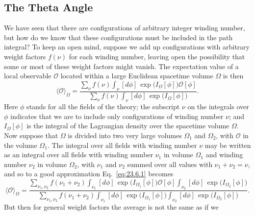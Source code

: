 \subsection{The Theta Angle}
\label{sec:23.6}

We have seen that there are configurations of arbitrary integer winding
number, but how do we know that these configurations must be included in
the path integral? To keep an open mind, suppose we add up configurations
with arbitrary weight factors $f(\nu)$ for each winding number, leaving
open the possibility that some or most of these weight factors might
vanish. The expectation value of a local observable $\mathcal O$ located
within a large Euclidean spacetime volume $\Omega$ is then
\begin{equation}
\langle\mathcal O\rangle_\Omega=
\frac{\displaystyle\sum_\nu f(\nu)\int_\nu[d\phi]\,
\exp\bigl(I_\Omega[\phi]\bigr)\mathcal O[\phi]}
{\displaystyle\sum_\nu f(\nu)\int_\nu[d\phi]\,
\exp\bigl(I_\Omega[\phi]\bigr)}.
\tag{23.6.1}\label{eq:23.6.1}
\end{equation}
Here $\phi$ stands for all the fields of the theory; the subscript $\nu$
on the integrals over $\phi$ indicates that we are to include only
configurations of winding number $\nu$; and $I_\Omega[\phi]$ is the
integral of the Lagrangian density over the spacetime volume $\Omega$.
Now suppose that $\Omega$ is divided into two very large volumes
$\Omega_1$ and $\Omega_2$, with $\mathcal O$ in the volume $\Omega_1$.
The integral over all fields with winding number $\nu$ may be written as
an integral over all fields with winding number $\nu_1$ in volume
$\Omega_1$ and winding number $\nu_2$ in volume $\Omega_2$, with $\nu_1$
and $\nu_2$ summed over all values with $\nu_1+\nu_2=\nu$, and so to a
good approximation Eq.~\eqref{eq:23.6.1} becomes
\begin{equation}
\langle\mathcal O\rangle_\Omega=
\frac{\displaystyle
\sum_{\nu_1,\nu_2}f(\nu_1+\nu_2)
\int_{\nu_1}[d\phi]\,\exp\bigl(I_{\Omega_1}[\phi]\bigr)\mathcal O[\phi]
\int_{\nu_2}[d\phi]\,\exp\bigl(I_{\Omega_2}[\phi]\bigr)}
{\displaystyle
\sum_{\nu_1,\nu_2}f(\nu_1+\nu_2)
\int_{\nu_1}[d\phi]\,\exp\bigl(I_{\Omega_1}[\phi]\bigr)
\int_{\nu_2}[d\phi]\,\exp\bigl(I_{\Omega_2}[\phi]\bigr)}.
\tag{23.6.2}\label{eq:23.6.2}
\end{equation}
But then for general weight factors the average is not the same as if we
